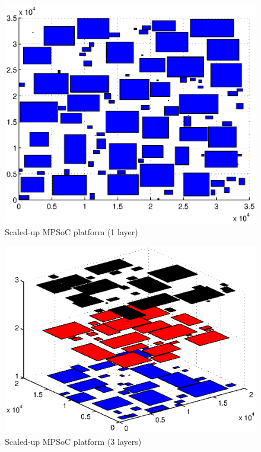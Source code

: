 \begin{figure}[h!]
\begin{center}
\includegraphics[width=\textwidth]{valid1lmandist.eps}
\caption{Scaled-up MPSoC platform (1 layer)}
\label{fig:valid1lmandist}
\end{center}
\end{figure}

\begin{figure}[h!]
\begin{center}
\includegraphics[width=\textwidth]{valid3lmandist.eps}
\caption{Scaled-up MPSoC platform (3 layers)}
\label{fig:valid3lmandist}
\end{center}
\end{figure}

